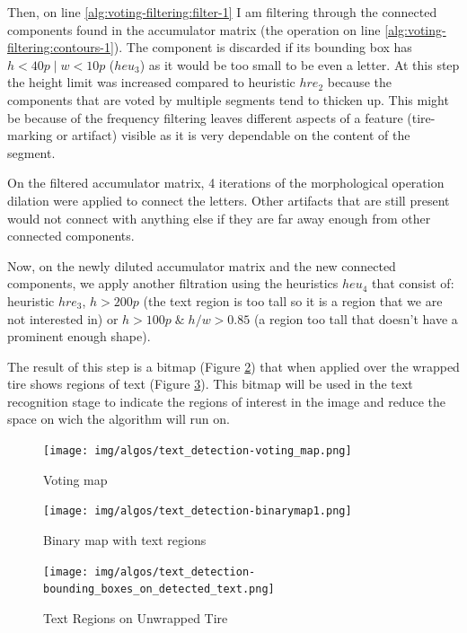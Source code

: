 Then, on line \ref{alg:voting-filtering:filter-1} I am filtering through the connected components found in the accumulator matrix (the operation on line \ref{alg:voting-filtering:contours-1}). The component is discarded if its bounding box has $h < 40p \;|\; w < 10p$ ($heu_3$\label{filtering:heuristics-3}) as it would be too small to be even a letter. At this step the height limit was increased compared to heuristic \hyperref[filtering:heuristics-2]{$hre_2$} because the components that are voted by multiple segments tend to thicken up. This might be because of the frequency filtering leaves different aspects of a feature (tire-marking or artifact) visible as it is very dependable on the content of the segment.

On the filtered accumulator matrix, 4 iterations of the morphological operation dilation were applied to connect the letters. Other artifacts that are still present would not connect with anything else if they are far away enough from other connected components.

Now, on the newly diluted accumulator matrix and the new connected components, we apply another filtration using the heuristics $heu_4$\label{filtering:heuristics-4} that consist of: heuristic \hyperref[filtering:heuristics-3]{$hre_3$}, $h > 200p$ (the text region is too tall so it is a region that we are not interested in) or $h > 100p \;\&\; h/w > 0.85$ (a region too tall that doesn't have a prominent enough shape).

The result of this step is a bitmap (Figure \ref{fig:text_detection-binarymap}) that when applied over the wrapped tire shows regions of text (Figure \ref{fig:text-regions-on-unwrapped-tire}). This bitmap will be used in the text recognition stage to indicate the regions of interest in the image and reduce the space on wich the algorithm will run on.

\begin{figure}
    \centering
    \texttt{[image: img/algos/text\_detection-voting\_map.png]}
    \caption{Voting map}
    \label{fig:text_detection-voting_map}
\end{figure}

\begin{figure}
    \centering
    \texttt{[image: img/algos/text\_detection-binarymap1.png]}
    \caption{Binary map with text regions}
    \label{fig:text_detection-binarymap}
\end{figure}

\begin{figure}
    \centering
    \texttt{[image: img/algos/text\_detection-bounding\_boxes\_on\_detected\_text.png]}
    \caption{Text Regions on Unwrapped Tire}
    \label{fig:text-regions-on-unwrapped-tire}
\end{figure}


